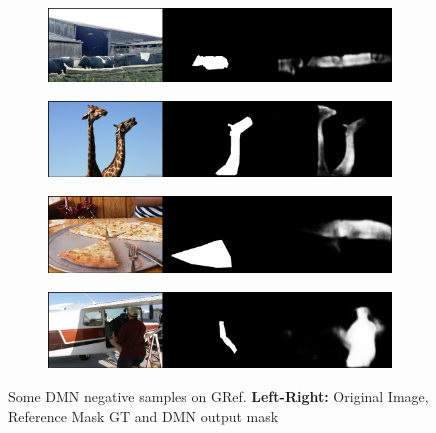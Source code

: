 \begin{figure}[!htbp]
    \centering
    \begin{subfigure}[b]{\columnwidth}
            \centering
            \includegraphics[width=\textwidth]{./figures/gref_samples/1_neg.png}
    \end{subfigure}
    
    \begin{subfigure}[b]{\columnwidth}
            \centering
            \includegraphics[width=\textwidth]{./figures/gref_samples/2_neg.png}
    \end{subfigure}
    
    \begin{subfigure}[b]{\columnwidth}
            \centering
            \includegraphics[width=\textwidth]{./figures/gref_samples/3_neg.png}
    \end{subfigure}
    
    \begin{subfigure}[b]{\columnwidth}
            \centering
            \includegraphics[width=\textwidth]{./figures/gref_samples/4_neg.png}
    \end{subfigure}
    \caption{Some DMN negative samples on GRef. \textbf{Left-Right:} Original Image, Reference Mask GT and DMN output mask}
    \label{Fig:GRef_Neg}
\end{figure}
\FloatBarrier


